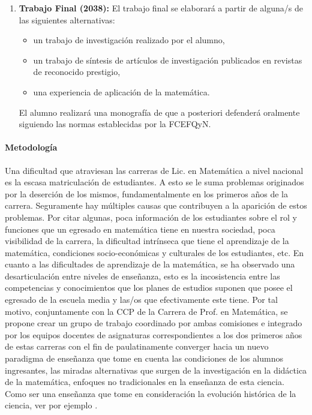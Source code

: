 \documentclass[a4paper, 12pt]{article}
\begin{document}
\begin{enumerate}
\item\textbf{Trabajo Final (2038):} El trabajo
final se elaborará a partir de alguna/s de las siguientes
alternativas:
\begin{itemize}
\item un trabajo de investigación realizado por el alumno,
\item un trabajo de síntesis de artículos de investigación publicados en
revistas de reconocido prestigio,
\item una experiencia de aplicación de la matemática.
\end{itemize}

El alumno realizará una monografía de  que a posteriori defenderá
oralmente siguiendo las normas establecidas por la FCEFQyN.

\end{enumerate}


\paragraph{Metodología}


Una dificultad que atraviesan las carreras de Lic. en Matemática a nivel nacional es la escasa matriculación de estudiantes. A esto se le suma problemas originados por la deserción de los mismos, fundamentalmente en los primeros años de la carrera. 
\newline
Seguramente hay múltiples causas que contribuyen a la aparición de estos problemas. Por citar algunas, poca información de los estudiantes sobre el rol y funciones que un egresado en matemática tiene en nuestra sociedad, poca visibilidad de la carrera, la dificultad intrínseca que tiene el aprendizaje de la matemática, condiciones socio-económicas y culturales de los estudiantes, etc.
\newline
En cuanto a las dificultades de aprendizaje de la matemática, se ha observado una desarticulación entre niveles de enseñanza, esto es la incosistencia entre  las competencias y conocimientos que los planes de estudios suponen que posee  el    egresado de la escuela media  y las/os que efectivamente este tiene.
\newline
Por tal motivo, conjuntamente con la CCP de la Carrera de Prof. en Matemática, se propone crear un grupo de trabajo coordinado por ambas comisiones e integrado por los equipos docentes de asignaturas correspondientes a los dos primeros años de estas carreras con el fin de paulatinamente converger hacia un nuevo paradigma de enseñanza que tome en cuenta las condiciones de los alumnos ingresantes, las  miradas alternativas que surgen de la investigación en la didáctica de la matemática, enfoques no tradicionales en la enseñanza  de esta ciencia. Como ser una enseñanza que tome en consideración la evolución histórica de la ciencia, ver por ejemplo  \cite{DavidM.Bressoud121,StephenAbbott134,ErnstHairer633,DavidApplebaum639,OttoToeplitz642,DavidBressoud643,DavidM.Bressoud651,DavidM.Bressoud688}.
\end{document}
